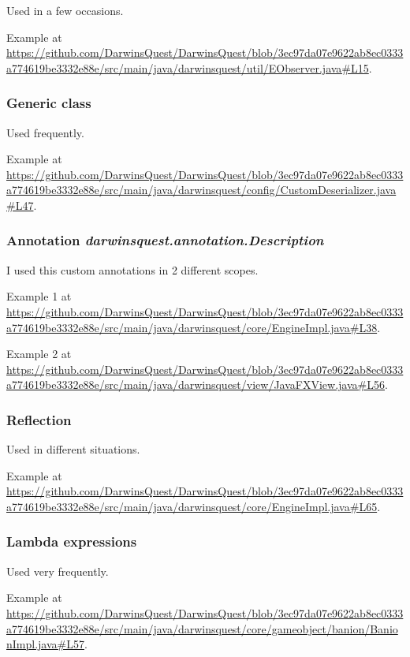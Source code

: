 \documentclass[12pt, a4paper]{report}
\theoremstyle{definition}
\begin{document}
        Used in a few occasions.

        Example at \url{https://github.com/DarwinsQuest/DarwinsQuest/blob/3ec97da07e9622ab8ec0333a774619be3332e88e/src/main/java/darwinsquest/util/EObserver.java#L15}.

        \subsubsection{Generic class}
        
        Used frequently.

        Example at \url{https://github.com/DarwinsQuest/DarwinsQuest/blob/3ec97da07e9622ab8ec0333a774619be3332e88e/src/main/java/darwinsquest/config/CustomDeserializer.java#L47}.

        \subsubsection{Annotation \emph{darwinsquest.annotation.Description}}

        I used this custom annotations in 2 different scopes.

        Example 1 at \url{https://github.com/DarwinsQuest/DarwinsQuest/blob/3ec97da07e9622ab8ec0333a774619be3332e88e/src/main/java/darwinsquest/core/EngineImpl.java#L38}.

        Example 2 at \url{https://github.com/DarwinsQuest/DarwinsQuest/blob/3ec97da07e9622ab8ec0333a774619be3332e88e/src/main/java/darwinsquest/view/JavaFXView.java#L56}.

        \subsubsection{Reflection}

        Used in different situations.

        Example at \url{https://github.com/DarwinsQuest/DarwinsQuest/blob/3ec97da07e9622ab8ec0333a774619be3332e88e/src/main/java/darwinsquest/core/EngineImpl.java#L65}.

        \subsubsection{Lambda expressions}

        Used very frequently.

        Example at \url{https://github.com/DarwinsQuest/DarwinsQuest/blob/3ec97da07e9622ab8ec0333a774619be3332e88e/src/main/java/darwinsquest/core/gameobject/banion/BanionImpl.java#L57}.
\end{document}

